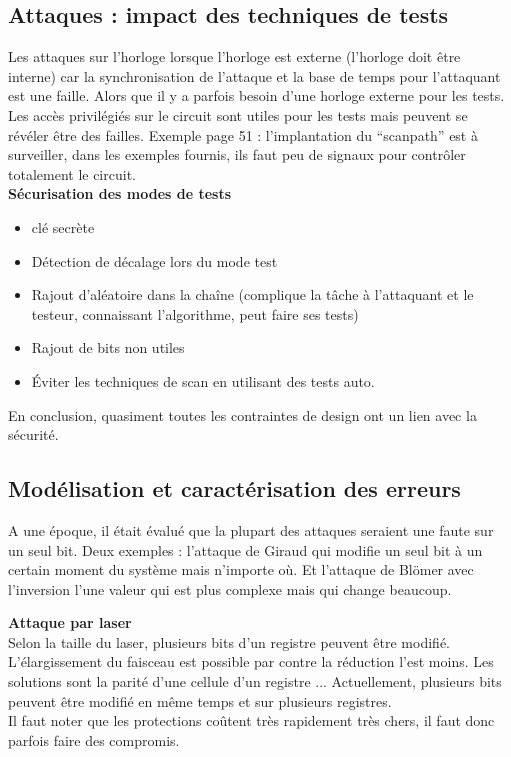 \documentclass[a4paper,12pt]{article}
\begin{document}
\subsection{Attaques : impact des techniques de tests}
Les attaques sur l'horloge lorsque l'horloge est externe (l'horloge doit être interne) car la synchronisation de l'attaque et la base de temps pour l'attaquant est une faille. Alors que il y a parfois besoin d'une horloge externe pour les tests. 
Les accès privilégiés sur le circuit sont utiles pour les tests mais peuvent se révéler être des failles. Exemple page 51 : l'implantation du ``scanpath'' est à surveiller, dans les exemples fournis, ils faut peu de signaux pour contrôler totalement le circuit.\\
{\bf Sécurisation des modes de tests}
\begin{itemize} 
\item clé secrète
\item Détection de décalage lors du mode test
\item Rajout d'aléatoire dans la chaîne (complique la tâche à l'attaquant et le testeur, connaissant l'algorithme, peut faire ses tests)
\item Rajout de bits non utiles
\item Éviter les techniques de scan en utilisant des tests auto.
\end{itemize}

En conclusion, quasiment toutes les contraintes de design ont un lien avec la sécurité. 

\subsection{Modélisation et caractérisation des erreurs}

A une époque, il était évalué que la plupart des attaques seraient une faute sur un seul bit.
Deux exemples : l'attaque de Giraud qui modifie un seul bit à un certain moment du système mais n'importe où. Et l'attaque de Blömer avec l'inversion l'une valeur qui est plus complexe mais qui change beaucoup.

{\bf Attaque par laser}\\
Selon la taille du laser, plusieurs bits d'un registre peuvent être modifié. L'élargissement du faisceau est possible par contre la réduction l'est moins. Les solutions sont la parité d'une cellule d'un registre ...
Actuellement, plusieurs bits peuvent être modifié en même temps et sur plusieurs registres.\\
Il faut noter que les protections coûtent très rapidement très chers, il faut donc parfois faire des compromis.
\end{document}
